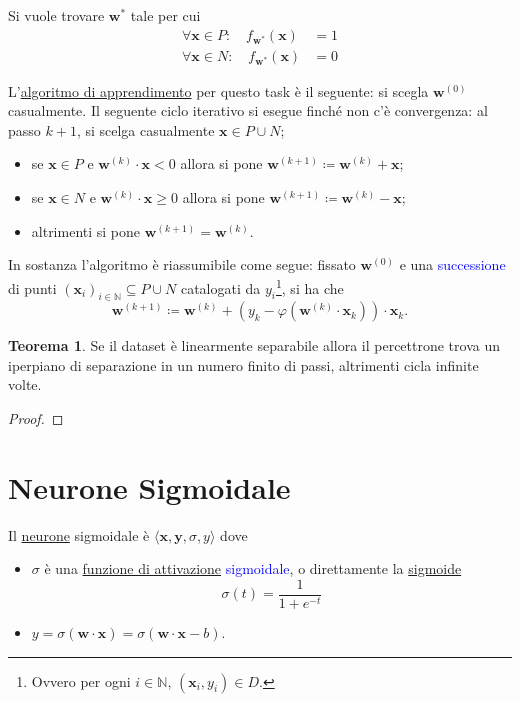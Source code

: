 \documentclass[10pt]{book}
\newcommand{\1}{\mathds{1}}
\newcommand{\N}{\mathds{N}}
\theoremstyle{definition}%
\newtheorem{thm}{Teorema}[section]
\theoremstyle{plain}
\theoremstyle{remark}
\renewcommand{\href}[2]{\textcolor{blue}{#2}}
\begin{document}
Si vuole trovare \(\bm{w}^{*}\) tale per cui
\begin{align*}
\forall \bm{x} \in P:\quad f_{\bm{w}^{*}}(\bm{x}) &=1\\
\forall \bm{x} \in N:\quad f_{\bm{w}^{*}}(\bm{x}) &=0
\end{align*}

L'\hyperref[sec:org8a5b276]{algoritmo di apprendimento} per questo task è il seguente: si scegla \(\bm{w}^{(0)}\) casualmente. Il seguente ciclo iterativo si esegue finché non c'è convergenza: al passo \(k+1\), si scelga casualmente \(\bm{x} \in P\cup N\);
\begin{itemize}
\item se \(\bm{x} \in P\) e \(\bm{w}^{(k)}\cdot \bm{x} <0\) allora si pone \(\bm{w}^{(k+1)} \coloneqq \bm{w}^{(k)}+\bm{x}\);
\item se \(\bm{x} \in N\) e \(\bm{w}^{(k)}\cdot \bm{x} \ge 0\) allora si pone \(\bm{w}^{(k+1)} \coloneqq \bm{w}^{(k)}-\bm{x}\);
\item altrimenti si pone \(\bm{w}^{(k+1)}=\bm{w}^{(k)}\).
\end{itemize}

In sostanza l'algoritmo è riassumibile come segue: fissato \(\bm{w}^{(0)}\) e una \href{../../../../../org/roam/20250115100904-successione.org}{successione} di punti \((\bm{x}_{i})_{i \in \N} \subseteq P\cup N\) catalogati da \(y_{i}\)\footnote{Ovvero per ogni \(i \in \N\), \((\bm{x}_{i},y_{i}) \in D\).}, si ha che
\begin{equation*}
\bm{w}^{(k+1)} \coloneqq \bm{w}^{(k)} + \left(y_{k} - \varphi(\bm{w}^{(k)}\cdot\bm{x}_{k})\right)\cdot\bm{x}_{k}.
\end{equation*}

\begin{thm}
Se il dataset è linearmente separabile allora il percettrone trova un iperpiano di separazione in un numero finito di passi, altrimenti cicla infinite volte.
\end{thm}

\begin{proof}
\lipsum[1]
\end{proof}
\section{Neurone Sigmoidale}
\label{sec:org04c890a}
Il \hyperref[sec:org779563c]{neurone} sigmoidale è \(\langle\bm{x},\bm{y},\sigma,y\rangle\) dove
\begin{itemize}
\item \(\sigma\) è una \hyperref[sec:org594e902]{funzione di attivazione} \href{../../../../../org/roam/20250625110110-funzione_sigmoidale.org}{sigmoidale}, o direttamente la \hyperref[sec:orgdb6d067]{sigmoide}
\begin{equation*}
  \sigma(t) = \frac{1}{1+e^{-t}}
\end{equation*}
\item \(y=\sigma(\bm{w}\cdot\bm{x}) = \sigma(\bm{w}\cdot\bm{x} - b)\).
\end{itemize}
\end{document}

